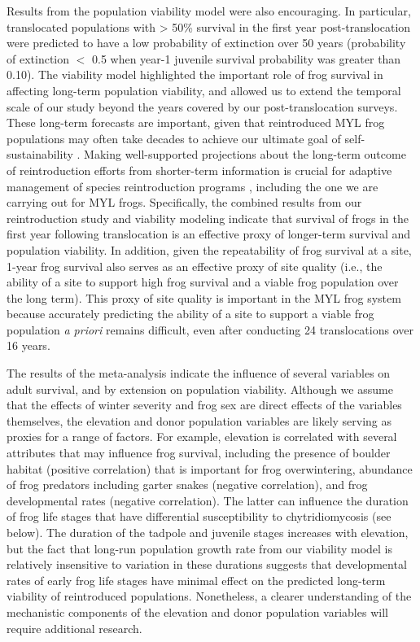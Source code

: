 \documentclass[9pt,twocolumn,twoside,lineno]{pnas-new}
\begin{document}
Results from the population viability model were also encouraging. In
particular, translocated populations with \textgreater{} 50\% survival
in the first year post-translocation were predicted to have a low
probability of extinction over 50 years (probability of extinction \(<\)
0.5 when year-1 juvenile survival probability was greater than 0.10).
The viability model highlighted the important role of frog survival in
affecting long-term population viability, and allowed us to extend the
temporal scale of our study beyond the years covered by our
post-translocation surveys. These long-term forecasts are important,
given that reintroduced MYL frog populations may often take decades to
achieve our ultimate goal of self-sustainability \citep{joseph2018}.
Making well-supported projections about the long-term outcome of
reintroduction efforts from shorter-term information is crucial for
adaptive management of species reintroduction programs
\citep{seddon2007}, including the one we are carrying out for MYL frogs.
Specifically, the combined results from our reintroduction study and
viability modeling indicate that survival of frogs in the first year
following translocation is an effective proxy of longer-term survival
and population viability. In addition, given the repeatability of frog
survival at a site, 1-year frog survival also serves as an effective
proxy of site quality (i.e., the ability of a site to support high frog
survival and a viable frog population over the long term). This proxy of
site quality is important in the MYL frog system because accurately
predicting the ability of a site to support a viable frog population
\emph{a priori} remains difficult, even after conducting 24
translocations over 16 years.

The results of the meta-analysis indicate the influence of several
variables on adult survival, and by extension on population viability.
Although we assume that the effects of winter severity and frog sex are
direct effects of the variables themselves, the elevation and donor
population variables are likely serving as proxies for a range of
factors. For example, elevation is correlated with several attributes
that may influence frog survival, including the presence of boulder
habitat (positive correlation) that is important for frog overwintering,
abundance of frog predators including garter snakes (negative
correlation), and frog developmental rates (negative correlation). The
latter can influence the duration of frog life stages that have
differential susceptibility to chytridiomycosis (see below). The
duration of the tadpole and juvenile stages increases with elevation,
but the fact that long-run population growth rate from our viability
model is relatively insensitive to variation in these durations suggests
that developmental rates of early frog life stages have minimal effect
on the predicted long-term viability of reintroduced populations.
Nonetheless, a clearer understanding of the mechanistic components of
the elevation and donor population variables will require additional
research.
\end{document}
